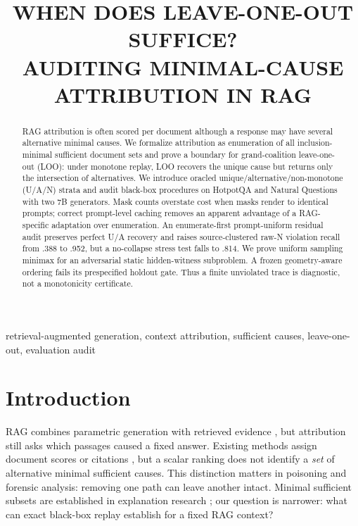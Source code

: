 \documentclass{article}
\title{WHEN DOES LEAVE-ONE-OUT SUFFICE?\\
AUDITING MINIMAL-CAUSE ATTRIBUTION IN RAG}
\begin{document}
\ninept
\maketitle

\begin{abstract}
RAG attribution is often scored per document although a response may have
several alternative minimal causes. We formalize attribution as enumeration of
all inclusion-minimal sufficient document sets and prove a boundary for
grand-coalition leave-one-out (LOO): under monotone replay, LOO recovers the
unique cause but returns only the intersection of alternatives. We introduce
oracled unique/alternative/non-monotone (U/A/N) strata and audit black-box
procedures on HotpotQA and Natural Questions with two 7B generators. Mask counts
overstate cost when masks render to identical prompts; correct prompt-level
caching removes an apparent advantage of a RAG-specific adaptation over
enumeration. An enumerate-first prompt-uniform residual audit preserves
perfect U/A recovery and raises source-clustered raw-N violation recall from
.388 to .952, but a no-collapse stress test falls to .814. We prove uniform
sampling minimax for an adversarial static hidden-witness subproblem. A frozen
geometry-aware ordering fails its prespecified holdout gate. Thus a
finite unviolated trace is diagnostic, not a monotonicity certificate.
\end{abstract}

\begin{keywords}
retrieval-augmented generation, context attribution, sufficient causes,
leave-one-out, evaluation audit
\end{keywords}

\section{Introduction}

RAG combines parametric generation with retrieved evidence
\cite{lewis2020rag,karpukhin2020,izacard2021}, but attribution still asks which passages caused a fixed
answer.
Existing methods assign document scores or citations
\cite{contextcite,mirage,selfcite}, but a scalar ranking does not identify a
\emph{set} of alternative minimal sufficient causes. This distinction matters in
poisoning and forensic analysis: removing one path can leave another intact.
Minimal sufficient subsets are established in explanation research
\cite{carter2019,ignatiev2019,marquessilva2021}; our question is narrower: what can exact
black-box replay establish for a fixed RAG context?
\end{document}

